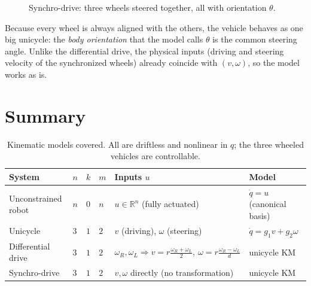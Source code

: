 \documentclass[11pt,a4paper]{article}
\def\boldsymbol#1{#1}%
\newcommand{\R}{\mathbb{R}}
\newcommand{\dq}{\dot q}
\theoremstyle{definition}
\theoremstyle{plain}
\theoremstyle{remark}
\begin{document}
\begin{figure}[h]
\centering
{}
\caption{Synchro-drive: three wheels steered together, all with orientation $\theta$.}
\end{figure}

\begin{intuition}
Because every wheel is always aligned with the others, the vehicle behaves as one big unicycle: the \emph{body orientation} that the model calls $\theta$ is the common steering angle. Unlike the differential drive, the physical inputs (driving and steering velocity of the synchronized wheels) already coincide with $(v,\omega)$, so the model works as is.
\end{intuition}

\section{Summary}

\begin{table}[h]
\centering\small
\renewcommand{\arraystretch}{1.25}
\begin{tabular}{@{}p{2.9cm}p{1.2cm}p{1.2cm}p{1.2cm}p{3.3cm}p{3.2cm}@{}}
\toprule
\textbf{System} & $\boldsymbol n$ & $\boldsymbol k$ & $\boldsymbol m$ & \textbf{Inputs $u$} & \textbf{Model}\\
\midrule
Unconstrained robot & $n$ & $0$ & $n$ & $u\in\R^n$ (fully actuated) & $\dq=u$ (canonical basis)\\
Unicycle & $3$ & $1$ & $2$ & $v$ (driving), $\omega$ (steering) & $\dq=g_1v+g_2\omega$\\
Differential drive & $3$ & $1$ & $2$ & $\omega_R,\omega_L\Rightarrow v=r\frac{\omega_R+\omega_L}2,\ \omega=r\frac{\omega_R-\omega_L}d$ & unicycle KM\\
Synchro-drive & $3$ & $1$ & $2$ & $v,\omega$ directly (no transformation) & unicycle KM\\
\bottomrule
\end{tabular}
\caption{Kinematic models covered. All are driftless and nonlinear in $q$; the three wheeled vehicles are controllable.}
\end{table}
\end{document}
